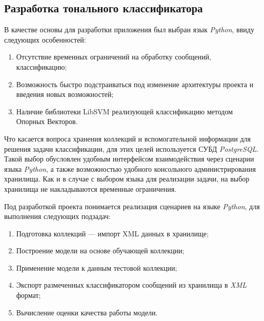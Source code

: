 \subsection{Разработка тонального классификатора}
    В качестве основы для разработки приложения был выбран язык {\it Python},
    ввиду следующих особенностей:
    \begin{enumerate}
        \item Отсутствие временных ограничений на обработку сообщений,
            классификацию;
        \item Возможность быстро подстраиваться под изменение архитектуры
            проекта и введения новых возможностей;
        \item Наличие библиотеки LibSVM реализующей
            классификацию методом Опорных Векторов.\cite{svmClassifier}
    \end{enumerate}

    Что касается вопроса хранения коллекций и вспомогательной информации
    для решения задачи классификации, для этих целей используется СУБД
    {\it PostgreSQL}. Такой выбор обусловлен удобным интерфейсом взаимодействия
    через сценарии языка {\it Python}, а также возможностью удобного консольного
    администрирования хранилища. Как и в случае с выбором языка для реализации
    задачи, на выбор хранилища не накладываются временные ограничения.

    Под разработкой проекта понимается реализация сценариев на языке {\it Python},
    для выполнения следующих подзадач:
    \begin{enumerate}
        \item Подготовка коллекций --- импорт XML данных в хранилище;
        \item Построение модели на основе обучающей коллекции;
        \item Применение модели к данным тестовой коллекции;
        \item Экспорт размеченных классификатором сообщений из хранилища в {\it XML} формат;
        \item Вычисление оценки качества работы модели.
    \end{enumerate}

